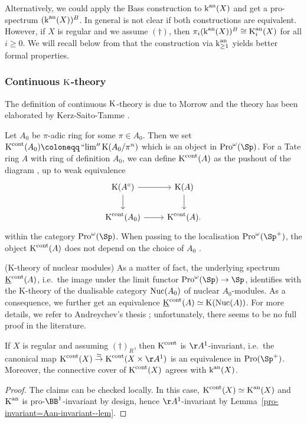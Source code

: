 \documentclass[colorinlistoftodos,article,11pt,reqno]{article}
\newcommand{\Pro}{\textup{Pro}}
\newcommand{\K}{\textup{K}}
\newcommand{\Kan}{\K^\textup{an}}
\newcommand{\kan}{\textup{k}^\textup{an}}
\newcommand{\Kcont}{\K^\textup{cont}}
\newcommand{\Arig}{\AA^{1}}
\newcommand{\Brig}{\BB^{1}}
\renewcommand{\to}[1][]{\overset{#1}{\rightarrow}}
\DeclareMathOperator*{\prolim}{``lim''}
\begin{document}
Alternatively, we could apply the Bass construction to $\kan(X)$ and get a pro\hyp{}spectrum $(\kan(X))^{B}$. In general is not clear if both constructions are equivalent. However, if $X$ is regular and we assume $(\dagger)$, then $\pi_{i} (\kan(X))^{B} \cong \Kan_{i}(X)$ for all $i\geq 0$. We will recall below from \cite{kst-ii} that the construction via $\kan_{\geq 1}$ yields better formal properties.

\subsubsection*{Continuous $\K$-theory}
The definition of continuous $\K$-theory is due to Morrow \cite{Morrow} and the theory has been elaborated by Kerz-Saito-Tamme \cite{kst-i}.

Let $A_0$ be $\pi$-adic ring for some $\pi\in A_0$.  Then we set $\Kcont(A_0)\coloneqq \prolim \K(A_0/\pi^{n})$ which is an object in $\Pro^\omega(\Sp)$. For a Tate ring $A$ with ring of definition $A_0$, we can define $\Kcont(A)$ as the pushout of the diagram , up to weak equivalence
$$ \begin{tikzcd}
		\K(A^{\circ})\arrow[r,""]\arrow[d,""]& \K(A)\arrow[d,""]\\
		\Kcont(A_0)\arrow[r,""]&\Kcont(A).
\end{tikzcd} $$
within the category $\Pro^\omega(\Sp)$. When passing to the localisation $\Pro^\omega(\Sp^+)$, the object $\Kcont(A)$ does not depend on the choice of $A_0$ \cite[Prop.~5.4]{kst-i}.


\begin{rem}(K-theory of nuclear modules) \label{connection-efimov-k-theory--rem}
As a matter of fact, the underlying spectrum $\underline{\K}^\textup{cont}(A)$, i.e.\ the image under the limit functor $\Pro^\omega(\Sp)\to\Sp$, identifies with the K-theory of the dualisable category $\textup{Nuc}(A_0)$ of nuclear $A_0$-modules. As a consequence, we further get an equivalence $\underline{\K}^\textup{cont}(A)\simeq \K(\textup{Nuc}(A))$. For more details, we refer to Andreychev's thesis \cite[Satz~5.8]{andreychev-thesis}; unfortunately, there seems to be no full proof in the literature.
\end{rem}


\begin{prop}
    If $X$ is regular and assuming $(\dagger)_R$, then $\Kcont$ is $\Arig$-invariant, i.e.\ the canonical map $\Kcont(X) \to[\simeq] \Kcont(X\times \Arig)$ is an equivalence in $\Pro(\Sp^+)$. Moreover, the connective cover of $\Kcont(X)$ agrees with $\kan(X)$.
\end{prop}
\begin{proof}
The claims can be checked locally. In this case, $\Kcont(X)\simeq\Kan(X)$ \cite[Thm.~6.19]{kst-i} and $\Kan$ is pro-$\Brig$-invariant by design, hence $\Arig$-invariant by Lemma~\ref{pro-invariant=Aan-invariant--lem}.
\end{proof}
\end{document}

